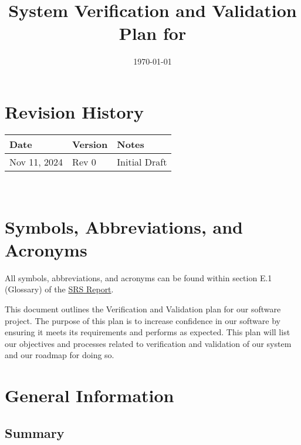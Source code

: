 \documentclass[12pt, titlepage]{article}
\begin{document}
\title{System Verification and Validation Plan for \progname{}} 
\author{\authname}
\date{\today}
	
\maketitle


\section*{Revision History}

\begin{tabularx}{\textwidth}{p{3cm}p{2cm}X}
\toprule {\bf Date} & {\bf Version} & {\bf Notes}\\
\midrule
Nov 11, 2024 & Rev 0 & Initial Draft\\
\bottomrule
\end{tabularx}

~\\

\newpage

\tableofcontents

\listoftables


\newpage

\section{Symbols, Abbreviations, and Acronyms}

All symbols, abbreviations, and acronyms can be found within section E.1 (Glossary) of the \href{https://github.com/takhtart/PCD/blob/main/docs/SRS/SRS.pdf}{SRS Report}.

\newpage


This document outlines the Verification and Validation  plan for our software project. 
The purpose of this plan is to increase confidence in our software by ensuring it meets its requirements and performs as expected. 
This plan will list our objectives and processes related to verification and validation of our system and our roadmap for doing so.

\section{General Information}

\subsection{Summary}
\end{document}
